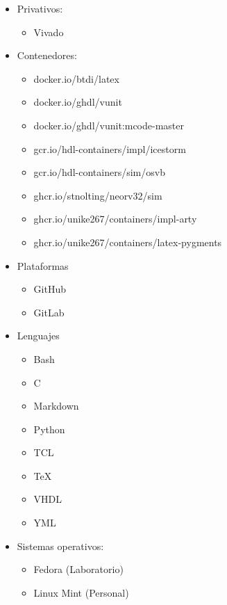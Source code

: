 \begin{itemize}
\begin{itemize}
\begin{itemize}
            \end{itemize}
        \item Privativos:
            \begin{itemize}
                \item Vivado
            \end{itemize}
        \item Contenedores:
            \begin{itemize}
                \item docker.io/btdi/latex
                \item docker.io/ghdl/vunit
                \item docker.io/ghdl/vunit:mcode-master
                \item gcr.io/hdl-containers/impl/icestorm
                \item gcr.io/hdl-containers/sim/osvb
                \item ghcr.io/stnolting/neorv32/sim
                \item ghcr.io/unike267/containers/impl-arty
                \item ghcr.io/unike267/containers/latex-pygments
            \end{itemize}
        \item Plataformas
            \begin{itemize}
                \item GitHub
                \item GitLab
            \end{itemize}
        \item Lenguajes
            \begin{itemize}
                \item Bash
                \item C
                \item Markdown
                \item Python
                \item TCL
                \item TeX
                \item VHDL
                \item YML
            \end{itemize}
        \item Sistemas operativos:
            \begin{itemize}
                \item Fedora (Laboratorio)
                \item Linux Mint (Personal)
            \end{itemize}
    \end{itemize}
\end{itemize}

